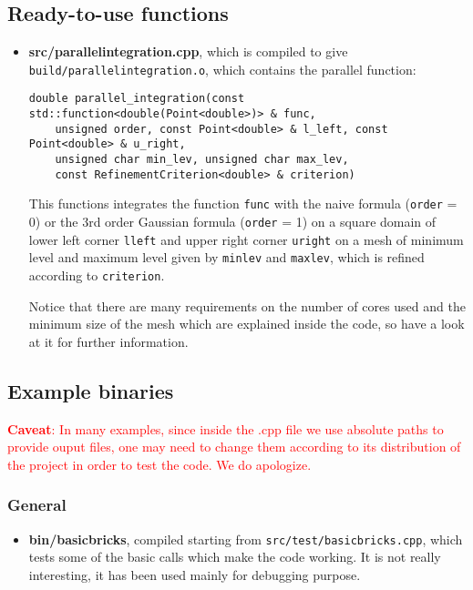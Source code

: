 \documentclass[a4paper,10pt]{article}
\begin{document}
\subsection{Ready-to-use functions}\label{foo1}
\begin{itemize}
 \item \textbf{src/parallel\textunderscore integration.cpp}, which is compiled to give \texttt{build/parallel\textunderscore integration.o}, which contains the parallel function:
 \begin{center}
  \begin{verbatim}
double parallel_integration(const std::function<double(Point<double>)> & func, 
    unsigned order, const Point<double> & l_left, const Point<double> & u_right, 
    unsigned char min_lev, unsigned char max_lev, 
    const RefinementCriterion<double> & criterion)   
  \end{verbatim}
 \end{center}
This functions integrates the function \texttt{func} with the naive formula (\texttt{order} = 0) or the 3rd order Gaussian formula (\texttt{order} = 1) on a square domain of lower left corner \texttt{l\textunderscore left} and upper right corner  \texttt{u\textunderscore right} on a mesh of minimum level and maximum level given by \texttt{min\textunderscore lev} and \texttt{max\textunderscore lev}, which is refined according to \texttt{criterion}.

Notice that there are many requirements on the number of cores used and the minimum size of the mesh which are explained inside the code, so have a look at it for further information.
\end{itemize}

\subsection{Example binaries}
\textcolor{red}{\textbf{Caveat}: In many examples, since inside the .cpp file we use absolute paths to provide ouput files, one may need to change them according to its distribution of the project in order to test the code. We do apologize.}
\subsubsection{General}
\begin{itemize}
 \item \textbf{bin/basic\textunderscore bricks}, compiled starting from \texttt{src/test/basic\textunderscore bricks.cpp}, which tests some of the basic calls which make the code working. It is not really interesting, it has been used mainly for debugging purpose.
 \end{itemize}
\end{document}
